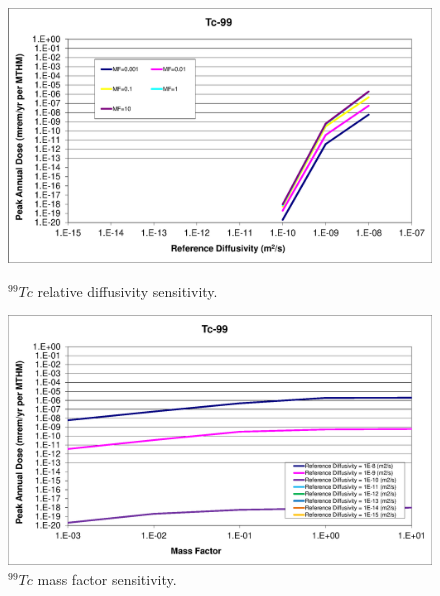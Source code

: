 \begin{figure}[ht!]
\centering
\begin{minipage}[b]{0.45\linewidth}
\includegraphics[width=\linewidth]{./chapters/nuclide_sensitivity/clay/DiffCoeffAndInvEBSFail/Tc-99.eps}
\caption{$^{99}Tc$ relative diffusivity sensitivity.} 
\label{fig:DCInvTc99}

\end{minipage}
\hspace{0.05\linewidth}
\begin{minipage}[b]{0.45\linewidth}

\includegraphics[width=\linewidth]{./chapters/nuclide_sensitivity/clay/DiffCoeffAndInvEBSFail/Tc-99-MF.eps}
\caption{$^{99}Tc$ mass factor sensitivity.}
\label{fig:DCInvTc99MF}

\end{minipage}
\end{figure}
